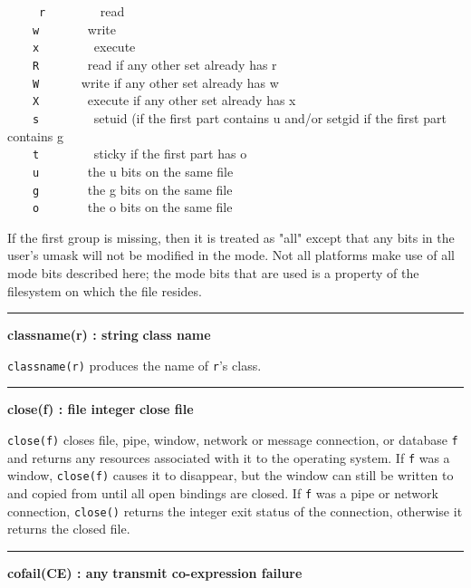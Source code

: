\ \ \ \ \ \texttt{r} \ \ \ \ \ \ \ \ read\\
 \ \ \ \ \texttt{w} \ \ \ \ \ \ \ write\\
 \ \ \ \ \texttt{x} \ \ \ \ \ \ \ \ execute\\
 \ \ \ \ \texttt{R} \ \ \ \ \ \ \ read if any other set already has
r\\
 \ \ \ \ \texttt{W} \ \ \ \ \ \ write if any other set already has
w\\
 \ \ \ \ \texttt{X} \ \ \ \ \ \ \ execute if any other set already has
x\\
 \ \ \ \ \texttt{s} \ \ \ \ \ \ \ \ setuid (if the first part contains u
and/or setgid if the first part contains g\\
 \ \ \ \ \texttt{t} \ \ \ \ \ \ \ \ sticky if the first part has
o\\
 \ \ \ \ \texttt{u} \ \ \ \ \ \ \ the u bits on the same file\\
 \ \ \ \ \texttt{g} \ \ \ \ \ \ \ the g bits on the same file\\
 \ \ \ \ \texttt{o} \ \ \ \ \ \ \ the o bits on the same file

If the first group is missing, then it is treated as
"all" except that any bits in the
user's umask will not be modified in the mode. Not all
platforms make use of all mode bits described here; the mode bits that
are used is a property of the filesystem on which the file resides.

\bigskip
\hrule\vspace{0.1cm}
\noindent
{\bf classname(r) : string } \hfill {\bf class name}

\noindent
\texttt{classname(r)} produces the name of \texttt{r}'s
class.

\bigskip
\hrule\vspace{0.1cm}
\noindent
{\bf close(f) : file {\textbar} integer } \hfill {\bf close file}

\noindent
{}\texttt{close(f)} closes file, pipe,
window, network or message connection, or database \texttt{f}
and returns any resources associated with it to the operating system.
If \texttt{f} was a window, \texttt{close(f)} causes it to disappear,
but the window can still be written to and copied from until all open
bindings are closed. If \texttt{f} was a pipe or network connection,
\texttt{close()} returns the integer exit
status of the connection, otherwise it returns the closed file.

\bigskip
\hrule\vspace{0.1cm}
\noindent
{\bf cofail(CE) : any } \hfill {\bf transmit co-expression failure}

